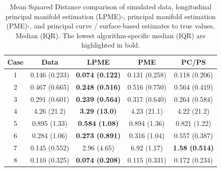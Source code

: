 \documentclass[12pt]{article}
\theoremstyle{definition}
\begin{document}
\begin{table}[h]
  \centering
  \begin{tabular}{|c c c c c|}
    \hline
    Case & Data & LPME & PME & PC/PS \\
    \hline
    1 & 0.146 (0.233) & {\bf 0.074 (0.122)} & 0.131 (0.258) & 0.118 (0.206) \\
    2 & 0.467 (0.665) & {\bf 0.248 (0.516)} & 0.516 (0.750) & 0.564 (0.419) \\
    3 & 0.291 (0.601) & {\bf 0.239 (0.564)} & 0.317 (0.640) & 0.264 (0.584) \\
    4 & 4.26 (21.2) & {\bf 3.29 (13.0)} & 4.23 (21.1) & 4.22 (21.2) \\
    5 & 0.895 (1.33) & {\bf 0.584 (1.08)} & 0.894 (1.36) & 0.821 (1.22) \\
    6 & 0.284 (1.06) & {\bf 0.273 (0.891)} & 0.316 (1.04) & 0.557 (0.387) \\
    7 & 0.145 (0.552) & 2.96 (4.65) & 6.92 (1.17) & {\bf 1.58 (0.514)} \\
    8 & 0.110 (0.325) & {\bf 0.074 (0.208)} & 0.115 (0.331) & 0.172 (0.234) \\
    \hline
  \end{tabular}
  \caption{Mean Squared Distance comparison of simulated data, longitudinal principal manifold estimation (LPME)-, principal manifold estimation (PME)-, and principal curve / surface-based estimates to true values, Median (IQR). The lowest algorithm-specific median (IQR) are highlighted in bold.}
  \label{table:simulation_results_median}
\end{table}
\end{document}
